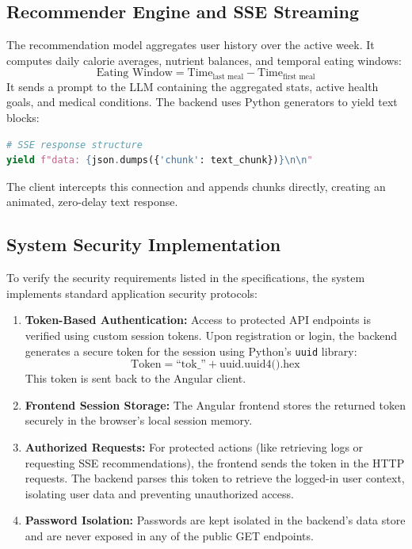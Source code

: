 \documentclass[12pt,a4paper,oneside]{report}
\begin{document}
\subsection{Recommender Engine and SSE Streaming}
The recommendation model aggregates user history over the active week. It computes daily calorie averages, nutrient balances, and temporal eating windows:
\begin{equation}
    \text{Eating Window} = \text{Time}_{\text{last meal}} - \text{Time}_{\text{first meal}}
\end{equation}
It sends a prompt to the LLM containing the aggregated stats, active health goals, and medical conditions. The backend uses Python generators to yield text blocks:
\begin{lstlisting}[language=Python]
# SSE response structure
yield f"data: {json.dumps({'chunk': text_chunk})}\n\n"
\end{lstlisting}
The client intercepts this connection and appends chunks directly, creating an animated, zero-delay text response.

\subsection{System Security Implementation}
To verify the security requirements listed in the specifications, the system implements standard application security protocols:
\begin{enumerate}
    \item \textbf{Token-Based Authentication:} Access to protected API endpoints is verified using custom session tokens. Upon registration or login, the backend generates a secure token for the session using Python's \texttt{uuid} library:
    \begin{equation}
        \text{Token} = \text{``tok\_''} + \text{uuid.uuid4().hex}
    \end{equation}
    This token is sent back to the Angular client.
    \item \textbf{Frontend Session Storage:} The Angular frontend stores the returned token securely in the browser's local session memory.
    \item \textbf{Authorized Requests:} For protected actions (like retrieving logs or requesting SSE recommendations), the frontend sends the token in the HTTP requests. The backend parses this token to retrieve the logged-in user context, isolating user data and preventing unauthorized access.
    \item \textbf{Password Isolation:} Passwords are kept isolated in the backend's data store and are never exposed in any of the public GET endpoints.
\end{enumerate}
\end{document}
